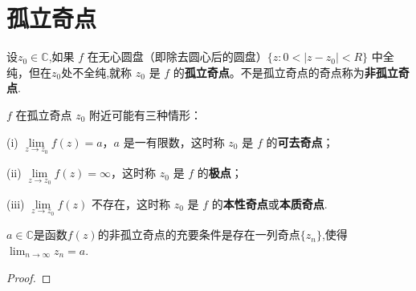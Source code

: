 \documentclass[../../main.tex]{subfiles}%
\begin{document}
\section{孤立奇点}

\begin{definition}
设$z_0\in \mathbb{C}$,如果 \( f \) 在无心圆盘（即除去圆心后的圆盘）\( \{ z: 0 < |z - z_0| < R \} \) 中全纯，但在$z_0$处不全纯,就称 \( z_0 \) 是 \( f \) 的\textbf{孤立奇点}。不是孤立奇点的奇点称为\textbf{非孤立奇点}.

\( f \) 在孤立奇点 \( z_0 \) 附近可能有三种情形：

(i) \( \lim\limits_{z \to z_0} f(z) = a \)，\( a \) 是一有限数，这时称 \( z_0 \) 是 \( f \) 的\textbf{可去奇点}；

(ii) \( \lim\limits_{z \to z_0} f(z) = \infty \)，这时称 \( z_0 \) 是 \( f \) 的\textbf{极点}；

(iii) \( \lim\limits_{z \to z_0} f(z) \) 不存在，这时称 \( z_0 \) 是 \( f \) 的\textbf{本性奇点}或\textbf{本质奇点}.
\end{definition}

\begin{theorem}
$a\in \mathbb{C}$是函数$f(z)$的非孤立奇点的充要条件是存在一列奇点$\{z_n\}$,使得$\lim_{n\to \infty}z_n=a.$
\end{theorem}
\begin{proof}

\end{proof}
\end{document}
